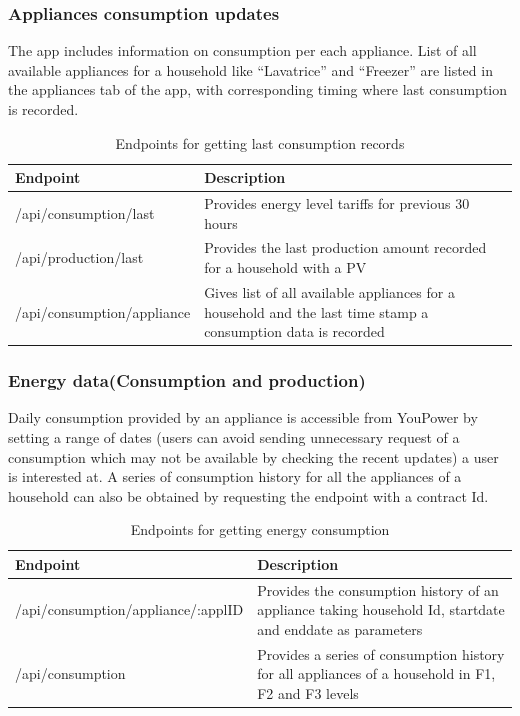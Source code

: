 \subsubsection{Appliances consumption updates}
The app includes information on consumption per each appliance. List of all available appliances for a household like “Lavatrice” and “Freezer” are listed in the appliances tab of the app, with corresponding timing where last consumption is recorded.
\begin{table}
\caption{Endpoints for getting last consumption records}\label{tab:app_nav}
\begin{center} \footnotesize 
\begin{tabular}{ l p{6cm}}
\hline
\textbf{Endpoint}  &
\textbf{Description}  \\ \hline


/api/consumption/last
  & 
Provides energy level tariffs for previous 30 hours \\ 
/api/production/last & Provides the last production amount recorded for a household with a PV \\ 
/api/consumption/appliance & Gives list of all available appliances for a household and the last time stamp a consumption data is recorded \\ 
 \hline
\end{tabular}
\end{center} 
\end{table}
\subsubsection{Energy data(Consumption and production)
}
Daily consumption provided by an appliance is accessible from YouPower by setting a range of dates (users can avoid sending unnecessary request of a consumption which may not be available by checking the recent updates) a user is interested at. A series of consumption history for all the appliances of a household can also be obtained by requesting the endpoint with a contract Id.
\begin{table}
\caption{Endpoints for getting energy consumption}\label{tab:app_nav}
\begin{center} \footnotesize 
\begin{tabular}{ l p{6cm}}
\hline
\textbf{Endpoint}  &
\textbf{Description}  \\ \hline


/api/consumption/appliance/:applID
  & 
Provides the consumption history of an appliance taking household Id, startdate and enddate as parameters \\ 
/api/consumption & Provides a series of consumption history for all appliances of a household in F1, F2 and F3 levels \\ 
 \hline
\end{tabular}
\end{center} 
\end{table}
